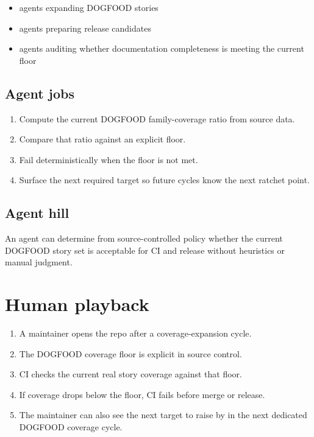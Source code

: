 \begin{itemize}
\tightlist
\item
  agents expanding DOGFOOD stories
\item
  agents preparing release candidates
\item
  agents auditing whether documentation completeness is meeting the current floor
\end{itemize}

\subsection{Agent jobs}\label{record-065-agent-jobs}

\begin{enumerate}
\def\labelenumi{\arabic{enumi}.}
\tightlist
\item
  Compute the current DOGFOOD family-coverage ratio from source data.
\item
  Compare that ratio against an explicit floor.
\item
  Fail deterministically when the floor is not met.
\item
  Surface the next required target so future cycles know the next ratchet point.
\end{enumerate}

\subsection{Agent hill}\label{record-065-agent-hill}

An agent can determine from source-controlled policy whether the current DOGFOOD story set is acceptable for CI and release without heuristics or manual judgment.

\section{Human playback}\label{record-065-human-playback}

\begin{enumerate}
\def\labelenumi{\arabic{enumi}.}
\tightlist
\item
  A maintainer opens the repo after a coverage-expansion cycle.
\item
  The DOGFOOD coverage floor is explicit in source control.
\item
  CI checks the current real story coverage against that floor.
\item
  If coverage drops below the floor, CI fails before merge or release.
\item
  The maintainer can also see the next target to raise by in the next dedicated DOGFOOD coverage cycle.
\end{enumerate}

